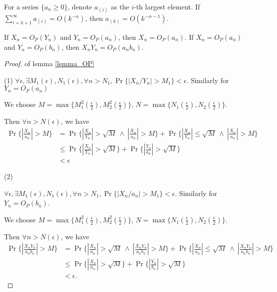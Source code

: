 \begin{lemma}
	For a series $\{ a_n \geq 0 \}$, denote $a_{(i)}$ as the $i$-th largest element. If $\sum_{i=k+1}^\infty a_{(i)} = O(k^{-\alpha})$, then $a_{(k)} = O(k^{-\alpha-1})$.
    \label{lemma_sum_single}
\end{lemma}

\begin{lemma}
	If $X_n = O_P(Y_n)$ and $Y_n = O_P(a_n)$, then $X_n = O_P(a_n)$.
	If $X_n = O_P(a_n)$ and $Y_n = O_P(b_n)$, then $X_n Y_n = O_P(a_n b_n)$.
    \label{lemma_OP}
\end{lemma}
\begin{proof}{of lemma \ref{lemma_OP}}

(1)
$\forall \epsilon, \exists M_1(\epsilon), N_1(\epsilon), \forall n > N_1, \Pr \{ |X_n/Y_n| > M_1 \} < \epsilon $. Similarly for $Y_n = O_P(a_n)$

We choose $M = \max\{ M_1^2(\frac{\epsilon}{2}), M_2^2(\frac{\epsilon}{2}) \}$, $N = \max \{ N_1(\frac{\epsilon}{2}), N_2(\frac{\epsilon}{2}) \}$.

Then $\forall n > N(\epsilon)$, we have
\begin{equation}
    \begin{split}
        \Pr \{ |\frac{X_n}{a_n}| > M \} &= \Pr\{ |\frac{X_n}{Y_n}| > \sqrt{M} \ \land \ |\frac{X_n}{a_n}| > M \} + \Pr \{ |\frac{X_n}{Y_n}| \leq \sqrt{M} \ \land \ |\frac{X_n}{a_n}| > M \} \\
        &\leq \Pr \{ |\frac{X_n}{Y_n}| > \sqrt{M} \} + \Pr \{ |\frac{Y_n}{a_n}| > \sqrt{M} \} \\
        &< \epsilon
    \end{split}
\end{equation}

(2)

$\forall \epsilon, \exists M_1(\epsilon), N_1(\epsilon), \forall n>N_1, \Pr \{ |X_n/a_n| > M_1 \} < \epsilon $. Similarly for $Y_n = O_P(b_n)$.

We choose $M = \max\{ M_1^2(\frac{\epsilon}{2}), M_2^2(\frac{\epsilon}{2}) \}$, $N = \max \{ N_1(\frac{\epsilon}{2}), N_2(\frac{\epsilon}{2}) \}$.

Then $\forall n>N(\epsilon)$, we have
\begin{equation}
	\begin{split}
		\Pr \{ |\frac{X_n Y_n}{a_n b_n}| > M \} &=  
			\Pr \{ |\frac{X_n}{a_n}| > \sqrt M \ \land\ |\frac{X_n Y_n}{a_n b_n}| > M  \} + 
			\Pr \{ |\frac{X_n}{a_n}| \leq \sqrt M \ \land\ |\frac{X_n Y_n}{a_n b_n}| > M  \} \\
		&\leq  \Pr \{ |\frac{X_n}{a_n}| > \sqrt M \} + 
			\Pr \{ |\frac{Y_n}{b_n}| > \sqrt M \} \\
		&< \epsilon.
	\end{split}
\end{equation}

\end{proof}

